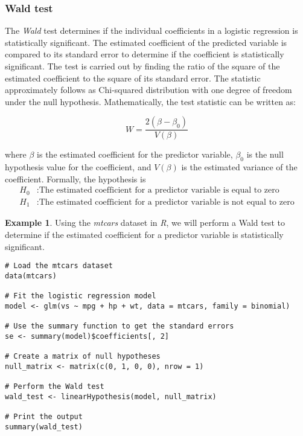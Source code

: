 \documentclass{article}[12pt]
\theoremstyle{definition}
\newtheorem{exmp}{Example}[section]
\begin{document}
\bigskip

\subsubsection{Wald test}

\bigskip

The \emph{Wald} test determines if the individual coefficients in a logistic regression is statistically significant. The estimated coefficient of the predicted variable is compared to its standard error to determine if the coefficient is statistically significant. The test is carried out by finding the ratio of the square of the estimated coefficient to the square of its standard error. The statistic approximately follows as Chi-squared distribution with one degree of freedom under the null hypothesis. Mathematically, the test statistic can be written as:

\medskip

$$ W = \frac{2 (\beta - \beta_0)}{V(\beta)}$$

\noindent
where $\beta$ is the estimated coefficient for the predictor variable, $\beta_0$ is the null hypothesis value for the coefficient, and $V(\beta)$ is the estimated variance of the coefficient. Formally, the hypothesis is 
\begin{align*}
H_0&: \text{The estimated coefficient for a predictor variable is equal to zero} \\
H_1&: \text{The estimated coefficient for a predictor variable is not equal to zero} 
\end{align*}

\newpage

\begin{exmp}
    Using the \emph{mtcars} dataset in \emph{R}, we will perform a Wald test to determine if the estimated coefficient for a predictor variable is statistically significant.
\end{exmp}

\begin{verbatim}
# Load the mtcars dataset
data(mtcars)

# Fit the logistic regression model
model <- glm(vs ~ mpg + hp + wt, data = mtcars, family = binomial)

# Use the summary function to get the standard errors
se <- summary(model)$coefficients[, 2]

# Create a matrix of null hypotheses
null_matrix <- matrix(c(0, 1, 0, 0), nrow = 1)

# Perform the Wald test
wald_test <- linearHypothesis(model, null_matrix)

# Print the output
summary(wald_test)    
\end{verbatim}
\end{document}
